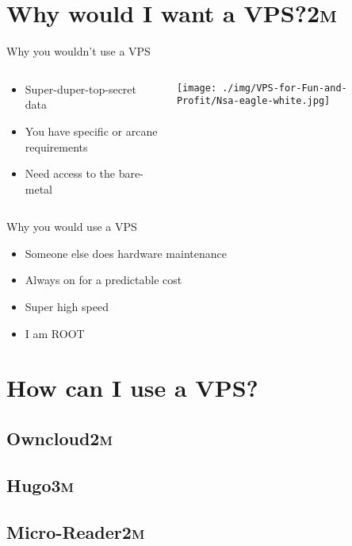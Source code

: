 \documentclass[presentation,aspectratio=169]{beamer}
\begin{document}
\section[Why would I want a VPS?]{Why would I want a VPS?\hfill{}\textsc{2m}}
\label{sec-3}
\begin{frame}[label=sec-3-0-1]{Why you wouldn't use a VPS}
\begin{columns}
\begin{column}{0.45\textwidth}

\begin{itemize}
\item Super-duper-top-secret data
\item You have specific or arcane requirements
\item Need access to the bare-metal
\end{itemize}
\end{column}

\begin{column}{0.45\textwidth}

\texttt{[image: ./img/VPS-for-Fun-and-Profit/Nsa-eagle-white.jpg]}
\end{column}
\end{columns}
\end{frame}


\begin{frame}[label=sec-3-0-2]{Why you would use a VPS}
\begin{itemize}
\item Someone else does hardware maintenance
\item Always on for a predictable cost
\item Super high speed
\item I am ROOT
\end{itemize}
\end{frame}
\section{How can I use a VPS?}
\label{sec-4}
\subsection[Owncloud]{Owncloud\hfill{}\textsc{2m}}
\label{sec-4-1}
\subsection[Hugo]{Hugo\hfill{}\textsc{3m}}
\label{sec-4-2}
\subsection[Micro-Reader]{Micro-Reader\hfill{}\textsc{2m}}
\label{sec-4-3}
\end{document}

